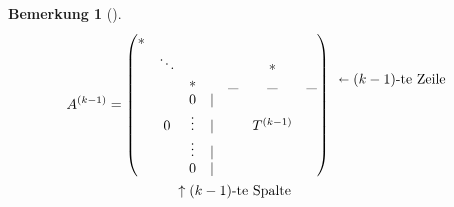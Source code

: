 \documentclass[ngerman,fontsize=11pt, paper=a4, parskip=half, titlepage=true, toc=bib]{scrbook}
\theoremstyle{definition}
\newtheorem{Bem}[Def]{Bemerkung}	%
\theoremstyle{plain}
\newenvironment{Beme}[1][]{ %
  \begin{Bem}[#1]
  }
  {
  \end{Bem}
  \addtocounter{subsection}{1}
}
\begin{document}
\begin{Beme}
  \begin{align*}
    A^{(k-1)} &=
                \begin{pmatrix}
                  *  &&&&&\\
                  &\ddots &&&& * \\
                  &&*&&\_&\_&\_ \\
                  &&0&|&\\
                  &0&\vdots&| &&T^{(k-1)}\\
                  &&\vdots&  |\\
                  &&0&  |
                \end{pmatrix}
                       \begin{array}{l}
                         \\
                         \shortleftarrow (k-1) \text{-te Zeile} \\
                         \\\\\\\\
                       \end{array}\\
              &\phantom{= \, (} \begin{array}{ccl}
                                  ~&~&~ \uparrow (k-1)\text{-te Spalte}
                                \end{array}
  \end{align*}
  

\end{Beme}
\end{document}
